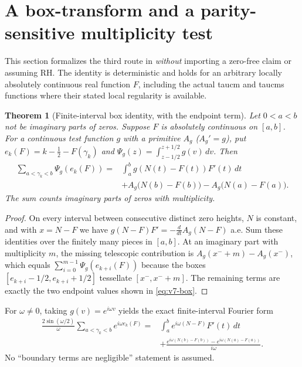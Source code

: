 \documentclass[11pt,a4paper]{article}
\numberwithin{equation}{section}
\newtheorem{theorem}{Theorem}[section]
\theoremstyle{definition}
\theoremstyle{remark}
\begin{document}
\section{A box-transform and a parity-sensitive multiplicity test}
\label{sec:v7-parity}
This section formalizes the third route in
\cite{CasanaV10Notes} \emph{without} importing a zero-free
claim or assuming RH. The identity is deterministic and holds
for an arbitrary locally absolutely continuous real function
$F$, including the actual taucm and taucms functions where
their stated local regularity is available.

\begin{theorem}[Finite-interval box identity, with the endpoint term]
\label{thm:v7-box}
Let $0<a<b$ not be imaginary parts of zeros. Suppose $F$ is
absolutely continuous on $[a,b]$. For a continuous test
function $g$ with a primitive $A_g$ ($A_g'=g$), put
$e_k(F)=k-\frac12-F(\gamma_k)$ and
$\Psi_g(z)=\int_{z-1/2}^{z+1/2}g(v)\,dv$. Then
\begin{equation}\label{eq:v7-box}
\begin{split}
\sum_{a<\gamma_k<b}\Psi_g(e_k(F))
={}&\int_a^b g(N(t)-F(t))F'(t)\,dt\\
 &+A_g\bigl(N(b)-F(b)\bigr)
   -A_g\bigl(N(a)-F(a)\bigr).
\end{split}
\end{equation}
The sum counts imaginary parts of zeros with multiplicity.
\end{theorem}
\begin{proof}
On every interval between consecutive distinct zero heights,
$N$ is constant, and with $x=N-F$ we have
$g(N-F)F'=-\frac d{dt} A_g(N-F)$ a.e. Sum these
identities over the finitely many pieces in $[a,b]$.
At an imaginary part with multiplicity $m$, the missing telescopic
contribution is
$A_g(x^-+m)-A_g(x^-)$, which equals
$\sum_{i=0}^{m-1}\Psi_g(e_{k+i}(F))$ because the boxes
$[e_{k+i}-1/2,e_{k+i}+1/2]$ tessellate $[x^-,x^-+m]$.
The remaining terms are exactly the two endpoint values
shown in \eqref{eq:v7-box}.
\end{proof}

For $\omega\ne0$, taking $g(v)=e^{i\omega v}$ yields the exact
finite-interval Fourier form
\begin{equation}\label{eq:v7-fourier-box}
\begin{split}
 \frac{2\sin(\omega/2)}{\omega}
 \sum_{a<\gamma_k<b}e^{i\omega e_k(F)}
={}&\int_a^b e^{i\omega(N-F)}F'(t)\,dt\\
 &+\frac{e^{i\omega(N(b)-F(b))}
          -e^{i\omega(N(a)-F(a))}}{i\omega}.
\end{split}
\end{equation}
No ``boundary terms are negligible'' statement is assumed.
\end{document}
